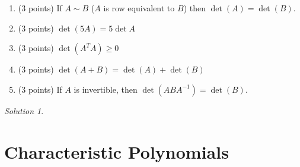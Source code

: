 \documentclass{article}
\theoremstyle{remark}
\newtheorem*{solution}{Solution}
\begin{document}
\begin{enumerate}
\item (3 points) If $A \sim B$ ($A$ is row equivalent to $B$) then $\det(A) = \det(B)$.
\item (3 points) $\det(5A) = 5\det A$
\item (3 points) $\det(A^TA) \geq 0$
\item (3 points) $\det(A + B) = \det(A) + \det(B)$
\item (3 points) If $A$ is invertible, then $\det(ABA^{-1}) = \det(B)$.
\end{enumerate}

\medskip

\begin{solution}
\end{solution}

\pagebreak
\section{Characteristic Polynomials}
\end{document}
